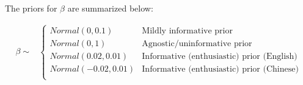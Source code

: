 \documentclass{ar-1col}\usepackage[]{graphicx}\usepackage[]{color}
\begin{document}
The priors for $\beta$ are summarized below:

\begin{align*}
\beta  \sim& \begin{cases}
      \mathit{Normal}(0,0.1) & \text{Mildly informative prior}\\
      \mathit{Normal}(0,1) & \text{Agnostic/uninformative prior}\\
      \mathit{Normal}(0.02,0.01) & \text{Informative (enthusiastic) prior (English)}\\
       \mathit{Normal}(-0.02,0.01) & \text{Informative (enthusiastic) prior (Chinese)}\\
    \end{cases}    \\
\end{align*}
\end{document}
